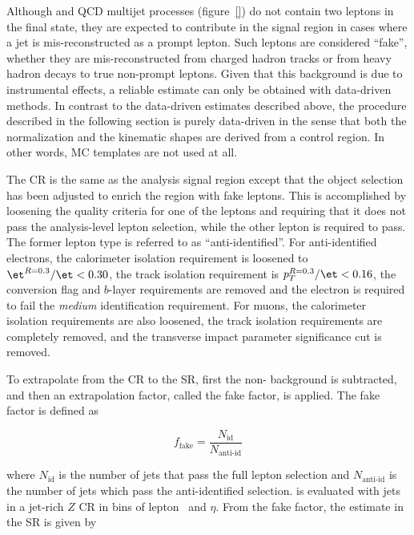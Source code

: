 
Although \wjets and QCD multijet processes (figure~\ref{}) do not contain two
leptons in the final state, they are expected to contribute in the
signal region in cases where a jet is mis-reconstructed as a prompt
lepton.  Such leptons are considered ``fake'', whether they are
mis-reconstructed from charged hadron tracks or from heavy hadron
decays to true non-prompt leptons. Given that this background is due
to instrumental effects, a reliable estimate can only be obtained with
data-driven methods. In contrast to the data-driven estimates
described above, the procedure described in the following section
is purely data-driven in the sense that both the normalization and the
kinematic shapes are derived from a control region. In other words,
\wjets MC templates are not used at all.

The \wjets CR is the same as the analysis signal region except that
the object selection has been adjusted to enrich the region with fake
leptons. This is accomplished by loosening the quality criteria for
one of the leptons and requiring that it does not pass the analysis-level
lepton selection, while the other lepton is required to pass. The
former lepton type is referred to as ``anti-identified''. For
anti-identified electrons, the calorimeter isolation requirement is
loosened to $\et^{R=0.3}/\et<0.30$, the track isolation requirement
is $p_T^{R=0.3}/\et<0.16$, the conversion flag and $b$-layer
requirements are removed and the electron is required to fail the {\it
  medium} identification requirement. For muons, the calorimeter
isolation requirements are also loosened, the track isolation
requirements are completely removed, and the transverse impact parameter
significance cut is removed.

To extrapolate from the \wjets CR to the SR, first the non-\wjets
background is subtracted, and then an extrapolation factor, called the
fake factor, is applied. The fake factor is defined as

\begin{equation}
\label{chap:analysis:equation:fake_factor}
f_{\textrm{fake}} =
\frac{N_{\textrm{id}}}{N_{\textrm{anti-id}}}
\end{equation}

\noindent
where $N_{\textrm{id}}$ is the number of jets that pass the
full lepton selection and $N_{\textrm{anti-id}}$ is the number
of jets which pass the anti-identified selection. \fakefact is
evaluated with jets in a jet-rich $Z$ CR in bins of lepton \pt~and
$\eta$. From the fake factor, the \wjets estimate in the SR is given
by

